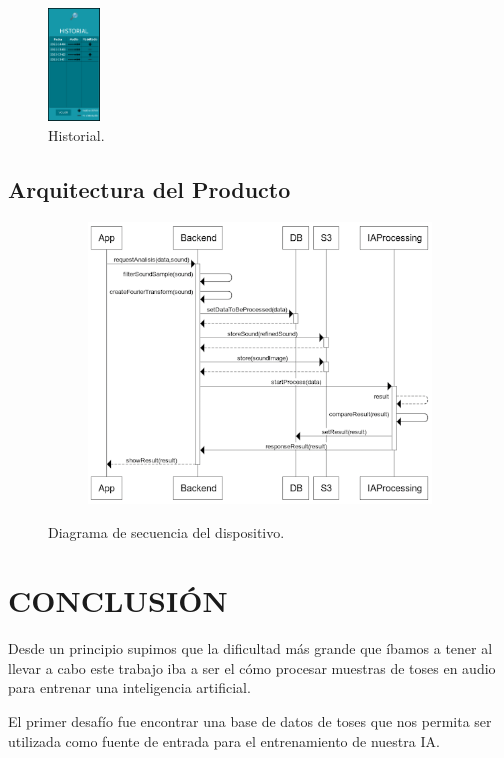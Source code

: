 \documentclass[journal]{IEEEtran}
\begin{document}
\begin{figure}[H]
\centering
\includegraphics[height=3cm]{figma06}
\caption{Historial.}
\end{figure}

\subsection{Arquitectura del Producto}
\begin{figure}[H]
\begin{subfigure}[b]{1\columnwidth}
\includegraphics[width=\textwidth]{diagrama_de_secuencia}
\end{subfigure}
\caption{Diagrama de secuencia del dispositivo.}
\end{figure}

\section{CONCLUSIÓN}
Desde un principio supimos que la dificultad más grande que íbamos a tener al llevar a cabo este trabajo iba a ser el cómo procesar muestras de toses en audio para entrenar una inteligencia artificial.

El primer desafío fue encontrar una base de datos de toses que nos permita ser utilizada como fuente de entrada para el entrenamiento de nuestra IA.
\end{document}
